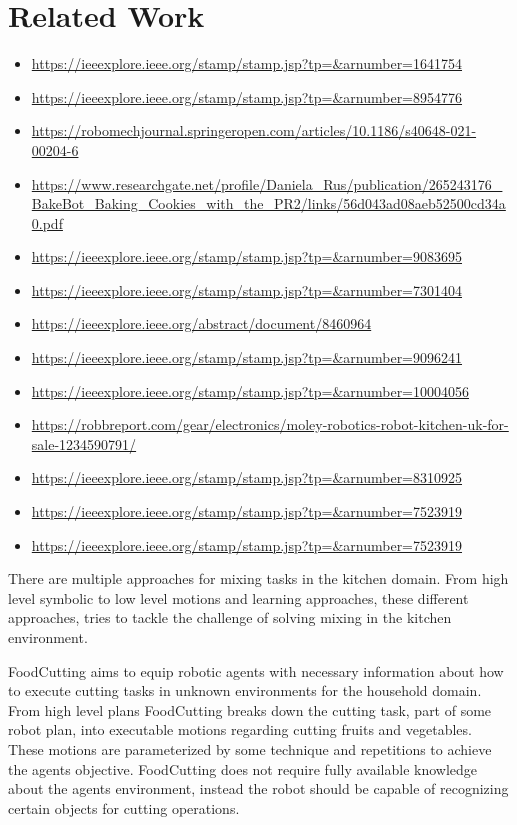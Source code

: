 \chapter*{Related Work}
\begin{itemize}
    \item \url{https://ieeexplore.ieee.org/stamp/stamp.jsp?tp=&arnumber=1641754}
    \item \url{https://ieeexplore.ieee.org/stamp/stamp.jsp?tp=&arnumber=8954776}
    \item \url{https://robomechjournal.springeropen.com/articles/10.1186/s40648-021-00204-6}
    \item \url{https://www.researchgate.net/profile/Daniela_Rus/publication/265243176_BakeBot_Baking_Cookies_with_the_PR2/links/56d043ad08aeb52500cd34a0.pdf}
    \item \url{https://ieeexplore.ieee.org/stamp/stamp.jsp?tp=&arnumber=9083695}
    \item \url{https://ieeexplore.ieee.org/stamp/stamp.jsp?tp=&arnumber=7301404}
    \item \url{https://ieeexplore.ieee.org/abstract/document/8460964}
    \item \url{https://ieeexplore.ieee.org/stamp/stamp.jsp?tp=&arnumber=9096241}
    \item \url{https://ieeexplore.ieee.org/stamp/stamp.jsp?tp=&arnumber=10004056}
    \item \url{https://robbreport.com/gear/electronics/moley-robotics-robot-kitchen-uk-for-sale-1234590791/}
    \item \url{https://ieeexplore.ieee.org/stamp/stamp.jsp?tp=&arnumber=8310925}
    \item \url{https://ieeexplore.ieee.org/stamp/stamp.jsp?tp=&arnumber=7523919}
    \item \url{https://ieeexplore.ieee.org/stamp/stamp.jsp?tp=&arnumber=7523919}
\end{itemize}

There are multiple approaches for mixing tasks in the kitchen domain. From high level symbolic to low level motions and 
learning approaches, these different approaches, tries to tackle the challenge of solving mixing in the kitchen environment.

FoodCutting aims to equip robotic agents with necessary information about how to 
execute  cutting tasks in unknown environments for the household domain. From high level plans FoodCutting breaks down 
the cutting task, part of some robot plan, into executable motions regarding cutting fruits and vegetables. These motions are parameterized 
by some technique and repetitions to achieve the agents objective. 
FoodCutting does not require fully available knowledge
about the agents environment, instead the robot should be capable of recognizing certain objects for cutting 
operations. 

